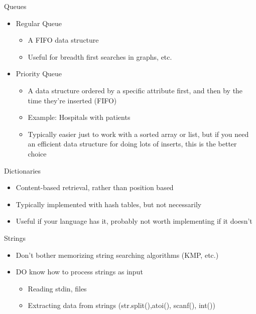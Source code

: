 \documentclass{beamer}
\begin{document}

\begin{frame}{Queues}
  \begin{centering}
    \begin{itemize}
      \item Regular Queue
      \begin{itemize}
        \item A FIFO data structure
        \item Useful for breadth first searches in graphs, etc.
      \end{itemize}
      \item Priority Queue
      \begin{itemize}
        \item A data structure ordered by a specific attribute first, and then by the time they're inserted (FIFO)
        \item Example: Hospitals with patients
        \item Typically easier just to work with a sorted array or list, but if you need an efficient data structure for doing lots of inserts, this is the better choice
      \end{itemize}
    \end{itemize}
  \end{centering}
\end{frame}

\begin{frame}{Dictionaries}
  \begin{centering}
    \begin{itemize}
      \item Content-based retrieval, rather than position based
      \item Typically implemented with hash tables, but not necessarily
      \item Useful if your language has it, probably not worth implementing if it doesn't
    \end{itemize}
  \end{centering}
\end{frame}

\begin{frame}{Strings}
  \begin{centering}
    \begin{itemize}
      \item Don't bother memorizing string searching algorithms (KMP, etc.)
      \item DO know how to process strings as input
      \begin{itemize}
        \item Reading stdin, files
        \item Extracting data from strings (str.split(),atoi(), scanf(), int())
      \end{itemize}
    \end{itemize}
  \end{centering}
\end{frame}
\end{document}
